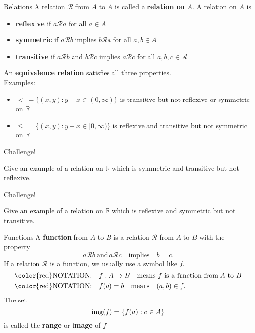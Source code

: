 \documentclass{beamer}
\begin{document}
\begin{frame}{Relations}
A relation $\mathcal R$ from $A$ to $A$ is called a \textbf{relation on} $A$.  A relation on $A$ is
\begin{itemize}
\pause
\item \textbf{reflexive} if $a\mathcal Ra$ for all $a\in A$
\pause
\item \textbf{symmetric} if $a\mathcal Rb$ implies $b\mathcal Ra$ for all $a,b\in A$
\pause
\item \textbf{transitive} if $a\mathcal Rb$ and $b\mathcal Rc$ implies $a\mathcal Rc$ for all $a,b,c\in\mathcal A$
\end{itemize}
\pause
An \textbf{equivalence relation} satisfies all three properties.\\
\pause
Examples:
\pause
\begin{itemize}
\pause
\item $<\ = \{(x,y): y-x\in (0,\infty)\}$ is transitive but not reflexive or symmetric on $\mathbb{R}$
\pause
\item $\leq\ = \{(x,y): y-x\in [0,\infty)\}$ is reflexive and transitive but not symmetric on $\mathbb{R}$
\end{itemize}
\end{frame}

\begin{frame}{Challenge!}
\begin{prob}
Give an example of a relation on $\mathbb{R}$ which is symmetric and transitive but not reflexive.
\end{prob}
\end{frame}

\begin{frame}{Challenge!}
\begin{prob}
Give an example of a relation on $\mathbb{R}$ which is reflexive and symmetric but not transitive.
\end{prob}
\end{frame}

\begin{frame}{Functions}
A \textbf{function} from $A$ to $B$ is a relation $\mathcal R$ from $A$ to $B$ with the property
\pause
$$a\mathcal Rb\ \text{and}\ a\mathcal Rc\quad\text{implies}\quad b=c.$$
\pause
If a relation $\mathcal R$ is a function, we usually use a symbol like $f$.\\
\pause
\begin{align*}
\text{\color{red}NOTATION:}&\quad f: A\rightarrow B\quad\text{means $f$ is a function from $A$ to $B$}\\
\text{\color{red}NOTATION:}&\quad f(a) = b\quad\text{means}\quad (a,b)\in f.
\end{align*}
\pause
The set $$\textnormal{img}(f) = \{f(a): a\in A\}$$ is called the \textbf{range} or \textbf{image} of $f$
\end{frame}
\end{document}

